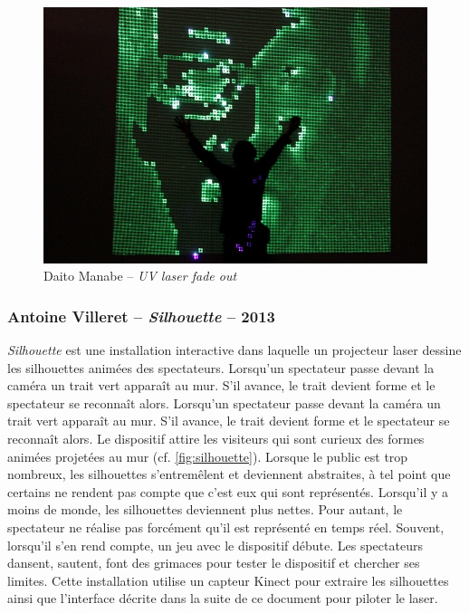 \begin{figure}[ht]
\begin{center}
\includegraphics[width=\textwidth]{images/UV_laser_fadeout.jpg} 
\end{center}
\caption{Daito Manabe -- \textit{UV laser fade out}}
\label{fig:uv_laser_fadeout}
\end{figure}

\subsubsection{Antoine Villeret -- \textit{Silhouette} -- 2013}


\begin{fr}
\textit{Silhouette} est une installation interactive dans laquelle un projecteur laser dessine les silhouettes animées des spectateurs.
Lorsqu'un spectateur passe devant la caméra un trait vert apparaît au mur. S'il avance, le trait devient forme et le spectateur se reconnaît alors. 
Lorsqu'un spectateur passe devant la caméra un trait vert apparaît au mur. S'il avance, le trait devient forme et le spectateur se reconnaît alors. 
Le dispositif attire les visiteurs qui sont curieux des formes animées projetées au mur (cf. \ref{fig:silhouette}). 
Lorsque le public est trop nombreux, les silhouettes s'entremêlent et deviennent abstraites, à tel point que certains ne rendent pas compte que c'est eux qui sont représentés. 
Lorsqu'il y a moins de monde, les silhouettes deviennent plus nettes. Pour autant, le spectateur ne réalise pas forcément qu'il est représenté en temps réel. 
Souvent, lorsqu'il s'en rend compte, un jeu avec le dispositif débute. Les spectateurs dansent, sautent, font des grimaces pour tester le dispositif et chercher ses limites.
Cette installation utilise un capteur Kinect pour extraire les silhouettes ainsi que l'interface décrite dans la suite de ce document pour piloter le laser.
\end{fr}


